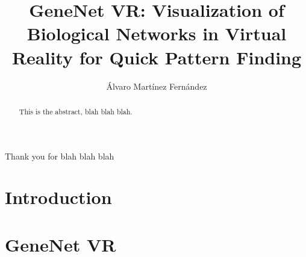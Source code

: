 \documentclass[USenglish]{uit-thesis}
\begin{document}

\title{GeneNet VR: Visualization of Biological Networks in Virtual Reality for Quick Pattern Finding}
\author{\'Alvaro Mart\'inez Fern\'andez}

\pgfplotsset{width=\textwidth}

\maketitle

\frontmatter

%


\begin{epigraph}
\end{epigraph}

\begin{abstract}
This is the abstract, blah blah blah.
\end{abstract}

\begin{acknowledgement}
Thank you for blah blah blah
\end{acknowledgement}

\tableofcontents

\mainmatter

\chapter{Introduction}


\chapter{GeneNet VR}

\end{document}
